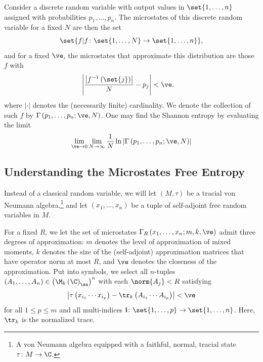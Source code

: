 \documentclass[10pt]{mypackage}
\begin{document}
Consider a discrete random variable with output values in $\set{1,\dots,n}$ assigned with probabilities $p_1,\dots,p_n$. The microstates of this discrete random variable for a fixed $N$ are then the set \[\set{f | f\colon \set{1,\dots,N}\rightarrow \set{1,\dots,n}},\] and for a fixed $\ve$, the microstates that approximate this distribution are those $f$ with
\begin{align*}
  \left\vert \frac{\left\vert f^{-1}\left( \set{j} \right) \right\vert}{N}-p_j \right\vert &< \ve,
\end{align*}
where $ \left\vert \cdot \right\vert $ denotes the (necessarily finite) cardinality. We denote the collection of such $f$ by $\Gamma\left( p_1,\dots,p_n;\ve,N \right)$. One may find the Shannon entropy by evaluating the limit
\begin{align*}
  \lim_{\ve\rightarrow 0}\lim_{N\rightarrow\infty} \frac{1}{N} \ln \left\vert \Gamma\left( p_1,\dots,p_n;\ve,N \right) \right\vert
\end{align*}
\subsection{Understanding the Microstates Free Entropy}%
Instead of a classical random variable, we will let $\left( M,\tau \right)$ be a tracial von Neumann algebra,\footnote{A von Neumann algebra equipped with a faithful, normal, tracial state $\tau\colon M\rightarrow \C$.} and let $\left( x_1,\dots,x_n \right)$ be a tuple of self-adjoint free random variables in $M$.

For a fixed $R$, we let the set of microstates $\Gamma_R\left( x_1,\dots,x_n;m,k,\ve \right)$ admit three degrees of approximation: $m$ denotes the level of approximation of mixed moments, $k$ denotes the size of the (self-adjoint) approximation matrices that have operator norm at most $R$, and $\ve$ denotes the closeness of the approximation. Put into symbols, we select all $n$-tuples $\left( A_1,\dots,A_n \right)\in \left( \M_k\left( \C \right)_{\sa} \right)^{n}$ with each $\norm{A_j} < R$ satisfying
\begin{align*}
  \left\vert \tau\left( x_{i_1}\cdots x_{i_p} \right)- \tr_{k}\left( A_{i_1}\cdots A_{i_p} \right) \right\vert < \ve
\end{align*}
for all $1\leq p \leq m$ and all multi-indices $ \mathbf{i}\colon \set{1,\dots,p}\rightarrow \set{1,\dots,n} $. Here, $\tr_k$ is the normalized trace.
\end{document}

